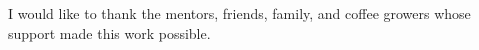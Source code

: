 I would like to thank the mentors, friends, family, and coffee growers whose support made this work possible.